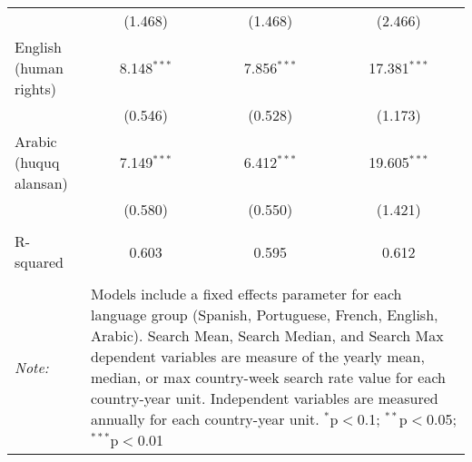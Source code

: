 \begin{table}[!htbp]
\begin{tabular}{@{\extracolsep{5pt}}lccc}
  & (1.468) & (1.468) & (2.466) \\ 
  English (human rights) & 8.148$^{***}$ & 7.856$^{***}$ & 17.381$^{***}$ \\ 
  & (0.546) & (0.528) & (1.173) \\ 
  Arabic (huquq alansan) & 7.149$^{***}$ & 6.412$^{***}$ & 19.605$^{***}$ \\ 
  & (0.580) & (0.550) & (1.421) \\ 
 \hline \\[-1.8ex] 
R-squared  & 0.603 & 0.595 & 0.612 \\ 
\hline 
\hline \\[-1.8ex] 
\textit{Note:}  & \multicolumn{3}{l}{\parbox[t]{8cm}{Models include a fixed effects parameter for each language group (Spanish, Portuguese, French, English, Arabic). Search Mean, Search Median, and Search Max dependent variables are measure of the yearly mean, median, or max country-week search rate value for each country-year unit. Independent variables are measured annually for each country-year unit. $^{*}$p$<$0.1; $^{**}$p$<$0.05; $^{***}$p$<$0.01}} \\ 
\end{tabular} 
\end{table} 
